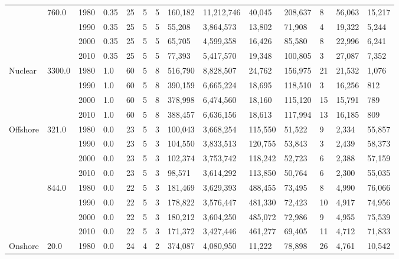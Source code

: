 \begin{table*}[]
\begin{tabular}{|l|l|l|l|l|l|l|l|l|l|l|l|l|l|}
	& \multirow{4}{*}{760.0} & 1980 & 0.35 & 25 & 5 & 5 & 160,182 & 11,212,746 & 40,045 & 208,637 & 8 & 56,063 & 15,217 \\ \cline{3-14} 
	&  & 1990 & 0.35 & 25 & 5 & 5 & 55,208 & 3,864,573 & 13,802 & 71,908 & 4 & 19,322 & 5,244 \\ \cline{3-14} 
	&  & 2000 & 0.35 & 25 & 5 & 5 & 65,705 & 4,599,358 & 16,426 & 85,580 & 8 & 22,996 & 6,241 \\ \cline{3-14} 
	&  & 2010 & 0.35 & 25 & 5 & 5 & 77,393 & 5,417,570 & 19,348 & 100,805 & 3 & 27,087 & 7,352 \\ \hline
	\multirow{4}{*}{Nuclear} & \multirow{4}{*}{3300.0} & 1980 & 1.0 & 60 & 5 & 8 & 516,790 & 8,828,507 & 24,762 & 156,975 & 21 & 21,532 & 1,076 \\ \cline{3-14} 
	&  & 1990 & 1.0 & 60 & 5 & 8 & 390,159 & 6,665,224 & 18,695 & 118,510 & 3 & 16,256 & 812 \\ \cline{3-14} 
	&  & 2000 & 1.0 & 60 & 5 & 8 & 378,998 & 6,474,560 & 18,160 & 115,120 & 15 & 15,791 & 789 \\ \cline{3-14} 
	&  & 2010 & 1.0 & 60 & 5 & 8 & 388,457 & 6,636,156 & 18,613 & 117,994 & 13 & 16,185 & 809 \\ \hline
	\multirow{8}{*}{Offshore} & \multirow{4}{*}{321.0} & 1980 & 0.0 & 23 & 5 & 3 & 100,043 & 3,668,254 & 115,550 & 51,522 & 9 & 2,334 & 55,857 \\ \cline{3-14} 
	&  & 1990 & 0.0 & 23 & 5 & 3 & 104,550 & 3,833,513 & 120,755 & 53,843 & 3 & 2,439 & 58,373 \\ \cline{3-14} 
	&  & 2000 & 0.0 & 23 & 5 & 3 & 102,374 & 3,753,742 & 118,242 & 52,723 & 6 & 2,388 & 57,159 \\ \cline{3-14} 
	&  & 2010 & 0.0 & 23 & 5 & 3 & 98,571 & 3,614,292 & 113,850 & 50,764 & 6 & 2,300 & 55,035 \\ \cline{2-14} 
	& \multirow{4}{*}{844.0} & 1980 & 0.0 & 22 & 5 & 3 & 181,469 & 3,629,393 & 488,455 & 73,495 & 8 & 4,990 & 76,066 \\ \cline{3-14} 
	&  & 1990 & 0.0 & 22 & 5 & 3 & 178,822 & 3,576,447 & 481,330 & 72,423 & 10 & 4,917 & 74,956 \\ \cline{3-14} 
	&  & 2000 & 0.0 & 22 & 5 & 3 & 180,212 & 3,604,250 & 485,072 & 72,986 & 9 & 4,955 & 75,539 \\ \cline{3-14} 
	&  & 2010 & 0.0 & 22 & 5 & 3 & 171,372 & 3,427,446 & 461,277 & 69,405 & 11 & 4,712 & 71,833 \\ \hline
	\multirow{4}{*}{Onshore} & \multirow{4}{*}{20.0} & 1980 & 0.0 & 24 & 4 & 2 & 374,087 & 4,080,950 & 11,222 & 78,898 & 26 & 4,761 & 10,542 \\ \cline{3-14} 

\end{tabular}
\end{table*}
